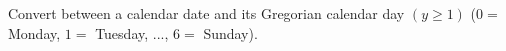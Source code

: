 Convert between a calendar date and its Gregorian calendar day $(y \ge 1)$ ($0 =$ Monday, $1 =$ Tuesday, $...$, $6 =$ Sunday).


